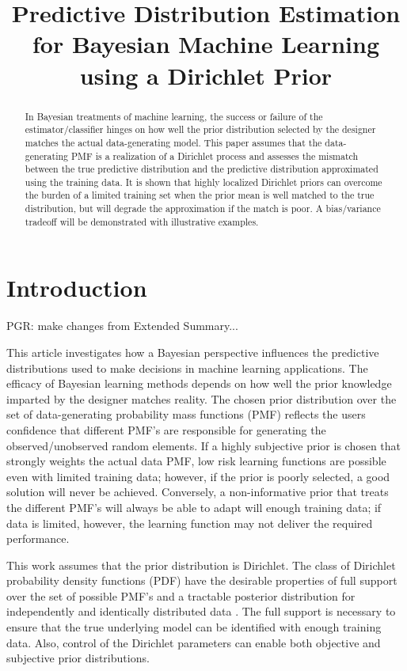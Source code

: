 \documentclass[conference]{IEEEtran}
\title{Predictive Distribution Estimation for Bayesian Machine Learning using a Dirichlet Prior}
\author{
\IEEEauthorblockN{Paul Rademacher}
\IEEEauthorblockA{U.S. Naval Research Laboratory\\Radar Division\\Washington, DC 20375, USA}
\and
\IEEEauthorblockN{Milo\v{s} Doroslova\v{c}ki}
\IEEEauthorblockA{The George Washington University\\Department of Electrical and Computer Engineering\\Washington, DC 20052, USA}
}
\begin{document}
\maketitle

\begin{abstract}
In Bayesian treatments of machine learning, the success or failure of the estimator/classifier hinges on how well the prior distribution selected by the designer matches the actual data-generating model. This paper assumes that the data-generating PMF is a realization of a Dirichlet process and assesses the mismatch between the true predictive distribution and the predictive distribution approximated using the training data. It is shown that highly localized Dirichlet priors can overcome the burden of a limited training set when the prior mean is well matched to the true distribution, but will degrade the approximation if the match is poor. A bias/variance tradeoff will be demonstrated with illustrative examples.
\end{abstract}


\section{Introduction}

PGR: make changes from Extended Summary...

This article investigates how a Bayesian perspective influences the predictive distributions used to make decisions in machine learning applications. The efficacy of Bayesian learning methods depends on how well the prior knowledge imparted by the designer matches reality. The chosen prior distribution over the set of data-generating probability mass functions (PMF) reflects the users confidence that different PMF's are responsible for generating the observed/unobserved random elements. If a highly subjective prior is chosen that strongly weights the actual data PMF, low risk learning functions are possible even with limited training data; however, if the prior is poorly selected, a good solution will never be achieved. Conversely, a non-informative prior that treats the different PMF's will always be able to adapt will enough training data; if data is limited, however, the learning function may not deliver the required performance.

This work assumes that the prior distribution is Dirichlet. The class of Dirichlet probability density functions (PDF) have the desirable properties of full support over the set of possible PMF's and a tractable posterior distribution for independently and identically distributed data \cite{ferguson}. The full support is necessary to ensure that the true underlying model can be identified with enough training data. Also, control of the Dirichlet parameters can enable both objective and subjective prior distributions. 
\end{document}
